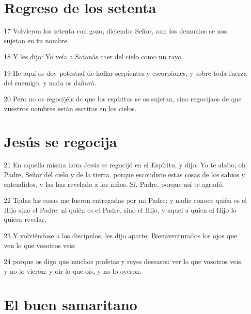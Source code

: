 \section*{Regreso de los setenta}

\par 17 Volvieron los setenta con gozo, diciendo: Señor, aun los demonios se nos sujetan en tu nombre.
\par 18 Y les dijo: Yo veía a Satanás caer del cielo como un rayo.
\par 19 He aquí os doy potestad de hollar serpientes y escorpiones, y sobre toda fuerza del enemigo, y nada os dañará.
\par 20 Pero no os regocijéis de que los espíritus se os sujetan, sino regocijaos de que vuestros nombres están escritos en los cielos.

\section*{Jesús se regocija}

\par 21 En aquella misma hora Jesús se regocijó en el Espíritu, y dijo: Yo te alabo, oh Padre, Señor del cielo y de la tierra, porque escondiste estas cosas de los sabios y entendidos, y las has revelado a los niños. Sí, Padre, porque así te agradó.
\par 22 Todas las cosas me fueron entregadas por mi Padre; y nadie conoce quién es el Hijo sino el Padre; ni quién es el Padre, sino el Hijo, y aquel a quien el Hijo lo quiera revelar.
\par 23 Y volviéndose a los discípulos, les dijo aparte: Bienaventurados los ojos que ven lo que vosotros veis;
\par 24 porque os digo que muchos profetas y reyes desearon ver lo que vosotros veis, y no lo vieron; y oír lo que oís, y no lo oyeron.

\section*{El buen samaritano}


